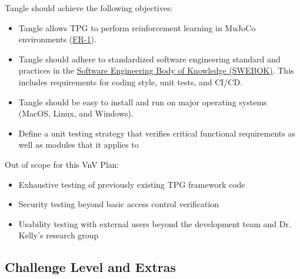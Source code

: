 \documentclass[12pt, titlepage]{article}
\begin{document}

Tangle should achieve the following objectives:
\begin{itemize}
\item Tangle allows TPG to perform reinforcement learning in MuJoCo environments (\href{https://github.com/TPGEngine/tpg/blob/main/docs/SRS/SRS.pdf}{FR-1}).
\item Tangle should adhere to standardized software engineering standard and practices in the \href{https://www.computer.org/education/bodies-of-knowledge/software-engineering}{Software Engineering Body of Knowledge (SWEBOK)}. This includes requirements for coding style, unit tests, and CI/CD.
\item Tangle should be easy to install and run on major operating systems (MacOS, Linux, and Windows).
\item Define a unit testing strategy that verifies critical functional requirements as well as modules that it applies to 
\end{itemize}

Out of scope for this VnV Plan:
\begin{itemize}
\item Exhaustive testing of previously existing TPG framework code
\item Security testing beyond basic access control verification
\item Usability testing with external users beyond the development team and Dr. Kelly's research group
\end{itemize}

\subsection{Challenge Level and Extras}

\end{document}
